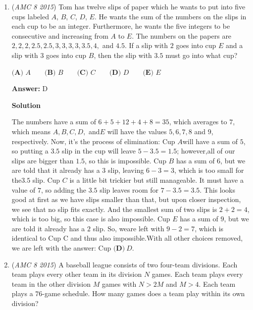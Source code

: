 \begin{enumerate}
 
We now test answer choice B.

 
$30$ = $2*3*5$  =>  30 has $2*2*2 = 8$ factors.

 
Let's test answer choice C.

 
$60$ = $2^2*3*5$  =>  60 has $3*2*2 = 12$ factors.

 
We know that $\boxed{\textbf{(C) } 60}$ is our answer.

 


	\item (\textit{AMC 8 2015}) Tom has twelve slips of paper which he wants to put into five cups labeled $A$, $B$, $C$, $D$, $E$. He wants the sum of the numbers on the slips in each cup to be an integer. Furthermore, he wants the five integers to be consecutive and increasing from $A$ to $E$. The numbers on the papers are $2, 2, 2, 2.5, 2.5, 3, 3, 3, 3, 3.5, 4,$ and $4.5$. If a slip with $2$ goes into cup $E$ and a slip with $3$ goes into cup $B$, then the slip with $3.5$ must go into what cup?


 $\textbf{(A) } A \qquad \textbf{(B) } B \qquad \textbf{(C) } C \qquad \textbf{(D) } D \qquad \textbf{(E) } E$

 \textbf{Answer: }D



\textbf{Solution}

The numbers have a sum of $6+5+12+4+8=35$, which averages to $7$, which means $A, B, C, D,$ and$E$ will have the values $5, 6, 7, 8$ and $9$, respectively. Now, it's the process of elimination: Cup $A$will have a sum of $5$, so putting a $3.5$ slip in the cup will leave $5-3.5=1.5$; however,all of our slips are bigger than $1.5$, so this is impossible. Cup $B$ has a sum of $6$, but we are told that it already has a $3$ slip, leaving $6-3=3$, which is too small for the$3.5$ slip. Cup $C$ is a little bit trickier but still manageable. It must have a value of $7$, so adding the $3.5$ slip leaves room for $7-3.5=3.5$. This looks good at first as we have slips smaller than that, but upon closer inspection, we see that no slip fits exactly. And the smallest sum of two slips is $2+2=4$, which is too big, so this case is also impossible. Cup $E$ has a sum of $9$, but we are told it already has a $2$ slip. So, weare left with $9-2=7$, which is identical to Cup C and thus also impossible.With all other choices removed, we are left with the answer: Cup $\boxed{\textbf{(D)}~D}$.

 


	\item (\textit{AMC 8 2015}) A baseball league consists of two four-team divisions. Each team plays every other team in its division $N$ games. Each team plays every team in the other division $M$ games with $N>2M$ and $M>4$. Each team plays a $76$-game schedule. How many games does a team play within its own division?



\end{enumerate}
